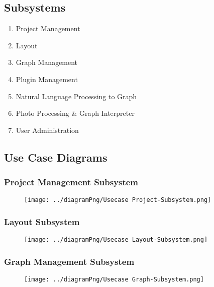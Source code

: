 \documentclass[11pt,a4paper]{article}
\begin{document}
\subsection*{Subsystems}
\begin{enumerate}
    \item Project Management
    \item Layout
    \item Graph Management
    \item Plugin Management
    \item Natural Language Processing to Graph
    \item Photo Processing \& Graph Interpreter
    \item User Administration
\end{enumerate}

\pagebreak

\subsection*{Use Case Diagrams}

\subsubsection*{Project Management Subsystem}
\begin{figure}[htbp]
    \centering
    \texttt{[image: ../diagramPng/Usecase Project-Subsystem.png]}
\end{figure}

\pagebreak
\subsubsection*{Layout Subsystem}
\begin{figure}[htbp]
    \centering
    \texttt{[image: ../diagramPng/Usecase Layout-Subsystem.png]}
\end{figure}

\subsubsection*{Graph Management Subsystem}
\begin{figure}[htbp]
    \centering
    \texttt{[image: ../diagramPng/Usecase Graph-Subsystem.png]}
\end{figure}
\end{document}
